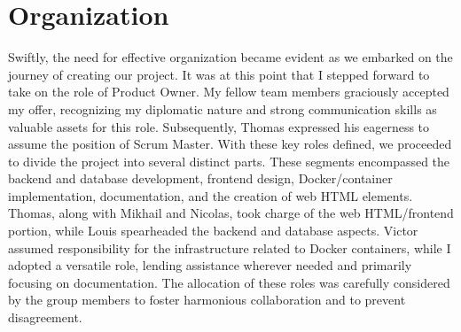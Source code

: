 \documentclass[12pt, a4paper]{article}
\begin{document}
\section{Organization}
Swiftly, the need for effective organization
became evident as we embarked on the journey of
creating our project. It was at this point that I
stepped forward to take on the role of Product
Owner. My fellow team members graciously accepted
my offer, recognizing my diplomatic nature and
strong communication skills as valuable assets
for this role. Subsequently, Thomas expressed
his eagerness to assume the position of Scrum
Master. With these key roles defined, we proceeded
to divide the project into several distinct parts.
These segments encompassed the backend and database
development, frontend design, Docker/container
implementation, documentation, and the creation
of web HTML elements. Thomas, along with Mikhail
and Nicolas, took charge of the web HTML/frontend
portion, while Louis spearheaded the backend and
database aspects. Victor assumed responsibility
for the infrastructure related to Docker containers,
while I adopted a versatile role, lending assistance
wherever needed and primarily focusing on documentation.
The allocation of these roles was carefully considered
by the group members to foster harmonious collaboration
and to prevent disagreement.
\end{document}
